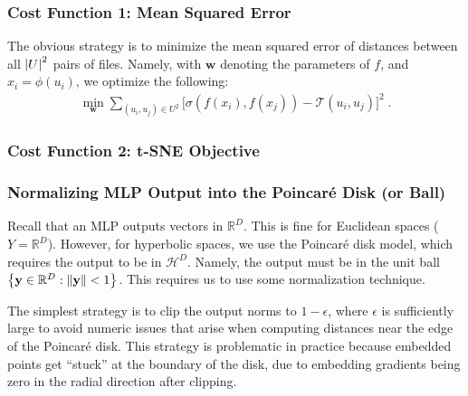 \documentclass{article}
\begin{document}
\subsubsection{Cost Function 1: Mean Squared Error}

The obvious strategy is to minimize the mean squared error of distances between all $\abs{U}^2$ pairs of files. Namely, with $\mathbf w$ denoting the parameters of $f$, and $x_i = \phi(u_i)$, we optimize the following:
\begin{align}
  \min_{\mathbf w} \sum_{(u_i, u_j) \in U^2} \Big[ \sigma(f(x_i), f(x_j)) - \mathcal T(u_i, u_j) \Big]^2 \; . \label{eq:mse-cost}
\end{align}

\subsubsection{Cost Function 2: t-SNE Objective}


\subsubsection{Normalizing MLP Output into the Poincaré Disk (or Ball)}

Recall that an MLP outputs vectors in $\mathbb R^D$. This is fine for Euclidean spaces ($Y = \mathbb R^D$). However, for hyperbolic spaces, we use the Poincaré disk model, which requires the output to be in $\mathcal H^D$. Namely, the output must be in the unit ball $\qty{\mathbf y \in \mathbb R^D : \norm{\mathbf y} < 1}$. This requires us to use some normalization technique.

The simplest strategy is to clip the output norms to $1-\epsilon$, where $\epsilon$ is sufficiently large to avoid numeric issues that arise when computing distances near the edge of the Poincaré disk. This strategy is problematic in practice because embedded points get ``stuck'' at the boundary of the disk, due to embedding gradients being zero in the radial direction after clipping.
\end{document}
